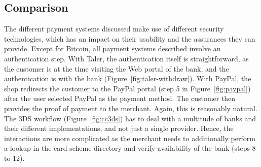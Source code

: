 \documentclass{IEEEtran}
\begin{document}
\subsection{Comparison}

The different payment systems discussed make use of different security
technologies, which has an impact on their usability and the
assurances they can provide.  Except for Bitcoin, all payment systems
described involve an authentication step.
With Taler, the authentication itself is straightforward, as the customer is
at the time visiting the Web portal of the bank, and the authentication is
with the bank (Figure~\ref{fig:taler-withdraw}).  With PayPal, the
shop redirects the customer to the PayPal portal (step 5 in
Figure~\ref{fig:paypal}) after the user selected PayPal as the payment
method. The customer then provides the proof of payment to the
merchant.  Again, this is reasonably natural.  The 3DS workflow
(Figure~\ref{fig:cc3ds}) has to deal with a multitude of banks and
their different implementations, and not just a single provider.
Hence, the interactions are more complicated as the merchant needs to
additionally perform a lookup in the card scheme directory and verify
availability of the bank (steps 8 to 12).
\end{document}
